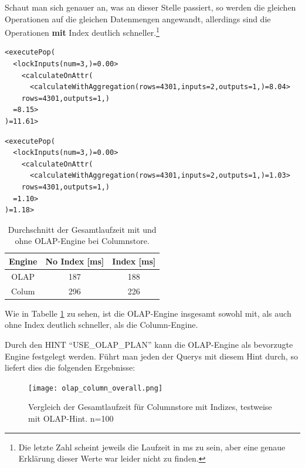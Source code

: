 Schaut man sich genauer an, was an dieser Stelle passiert, so werden die gleichen Operationen auf die gleichen Datenmengen angewandt, allerdings sind die Operationen \textbf{mit} Index deutlich schneller.\footnote{Die letzte Zahl scheint jeweils die Laufzeit in ms zu sein, aber eine genaue Erklärung dieser Werte war leider nicht zu finden.}
\begin{lstlisting}[breaklines, caption=Ohne Index]
<executePop(
  <lockInputs(num=3,)=0.00>
    <calculateOnAttr(
      <calculateWithAggregation(rows=4301,inputs=2,outputs=1,)=8.04>
    rows=4301,outputs=1,)
  =8.15>
)=11.61>
\end{lstlisting}

\begin{lstlisting}[breaklines, caption=Mit Index]
<executePop(
  <lockInputs(num=3,)=0.00>
    <calculateOnAttr(
      <calculateWithAggregation(rows=4301,inputs=2,outputs=1,)=1.03>
    rows=4301,outputs=1,)
  =1.10>
)=1.18>
\end{lstlisting}

\iffalse
\setlength\intextsep{0pt}
\begin{table}
    \begin{tabular}{ccc}
        \toprule
        Engine              & No Index [ms]   & Index [ms] \\
        \toprule
        OLAP                & 187        & 188            \\
        Colum               & 296        & 226            \\   
        \bottomrule
    \end{tabular}
	\caption{Durchschnitt der Gesamtlaufzeit mit und ohne OLAP-Engine bei Columnstore.}
    \label{tab:olap}
\end{table}



Wie in Tabelle \ref{tab:olap} zu sehen, ist die OLAP-Engine insgesamt sowohl mit, als auch ohne Index deutlich schneller, als die Column-Engine. 

Durch den HINT \enquote{USE\_OLAP\_PLAN} kann die OLAP-Engine als bevorzugte Engine festgelegt werden. Führt man jeden der Querys mit diesem Hint durch, so liefert dies die folgenden Ergebnisse:

\begin{figure}[H]
    \centering
    \texttt{[image: olap\_column\_overall.png]}
    \caption{Vergleich der Gesamtlaufzeit für Columnstore mit Indizes, testweise mit OLAP-Hint. n=100}
	\label{fig:olap_column_overall}
\end{figure}

